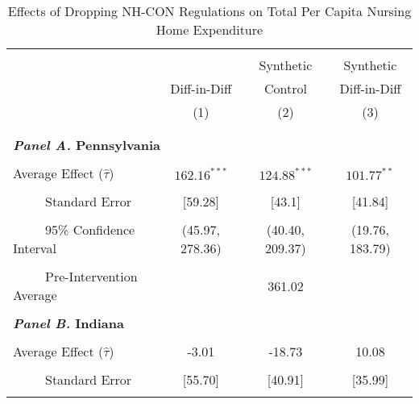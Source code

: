 \documentclass[../Main.tex]{subfiles}
\begin{document}
\newpage
\null
\vfill
\begin{table}[htbp]\centering \footnotesize
\def\sym#1{\ifmmode^{#1}\else\(^{#1}\)\fi}
\captionsetup{width=.78\textwidth}
\caption{\centering Effects of Dropping NH-CON Regulations on Total Per Capita Nursing Home Expenditure}
\label{tab:ave_results_tot_exp}
\setlength{\tabcolsep}{10pt}
\begin{tabular}{l*{3}{c}}
\hline\hline
\\[-2ex]
&\multicolumn{1}{c}{}&\multicolumn{1}{c}{Synthetic}&\multicolumn{1}{c}{Synthetic}\\
&\multicolumn{1}{c}{Diff-in-Diff}&\multicolumn{1}{c}{Control}&\multicolumn{1}{c}{Diff-in-Diff}\\
&\multicolumn{1}{c}{(1)}&\multicolumn{1}{c}{(2)}&\multicolumn{1}{c}{(3)}\\
\\[-2ex]
\hline
\\[-.1ex]
\multicolumn{4}{l}{\textbf{\textit{Panel A.} Pennsylvania}}\\
\\[-1.5ex]
\multicolumn{1}{l}{Average Effect ($\hat{\tau}$)}&   \multicolumn{1}{c}{$162.16^{***}$}&   \multicolumn{1}{c}{$124.88^{***}$}&  \multicolumn{1}{c}{$101.77^{**}$}\\
\\[-2ex]
\multicolumn{1}{l}{\ \ \ \ \ Standard Error}  &\multicolumn{1}{c}{[59.28]}&\multicolumn{1}{c}{[43.1]}&\multicolumn{1}{c}{[41.84]}\\
\\[-2ex]
\multicolumn{1}{l}{\ \ \ \ \ 95\% Confidence Interval}&   \multicolumn{1}{c}{(45.97, 278.36)}&   \multicolumn{1}{c}{(40.40, 209.37)}&   \multicolumn{1}{c}{(19.76, 183.79)}\\
\\[-2ex]
\multicolumn{1}{l}{\ \ \ \ \ Pre-Intervention Average}&   \multicolumn{3}{c}{361.02}\\
\\[-.1ex]
\multicolumn{4}{l}{\textbf{\textit{Panel B.} Indiana}}\\
\\[-1.5ex]
\multicolumn{1}{l}{Average Effect ($\hat{\tau}$)}&   \multicolumn{1}{c}{-3.01}&   \multicolumn{1}{c}{-18.73}&  \multicolumn{1}{c}{10.08}\\
\\[-2ex]
\multicolumn{1}{l}{\ \ \ \ \ Standard Error}  &\multicolumn{1}{c}{[55.70]}&\multicolumn{1}{c}{[40.91]}&\multicolumn{1}{c}{[35.99]}\\
\\[-2ex]

\end{tabular}
\end{table}
\end{document}
